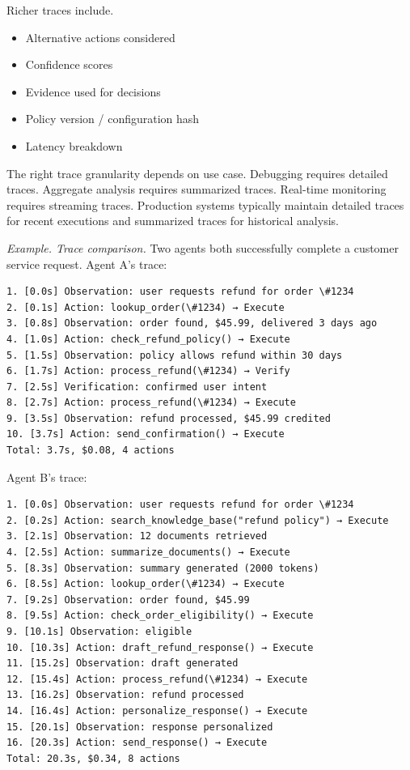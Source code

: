 Richer traces include.

\begin{itemize}
\item Alternative actions considered
\item Confidence scores
\item Evidence used for decisions
\item Policy version / configuration hash
\item Latency breakdown
\end{itemize}

The right trace granularity depends on use case. Debugging requires detailed traces. Aggregate analysis requires summarized traces. Real-time monitoring requires streaming traces. Production systems typically maintain detailed traces for recent executions and summarized traces for historical analysis.

\textit{Example. Trace comparison.} Two agents both successfully complete a customer service request. Agent A's trace:

{\footnotesize
\begin{verbatim}
1. [0.0s] Observation: user requests refund for order \#1234
2. [0.1s] Action: lookup_order(\#1234) → Execute
3. [0.8s] Observation: order found, $45.99, delivered 3 days ago
4. [1.0s] Action: check_refund_policy() → Execute
5. [1.5s] Observation: policy allows refund within 30 days
6. [1.7s] Action: process_refund(\#1234) → Verify
7. [2.5s] Verification: confirmed user intent
8. [2.7s] Action: process_refund(\#1234) → Execute
9. [3.5s] Observation: refund processed, $45.99 credited
10. [3.7s] Action: send_confirmation() → Execute
Total: 3.7s, $0.08, 4 actions
\end{verbatim}
}

Agent B's trace:

{\footnotesize
\begin{verbatim}
1. [0.0s] Observation: user requests refund for order \#1234
2. [0.2s] Action: search_knowledge_base("refund policy") → Execute
3. [2.1s] Observation: 12 documents retrieved
4. [2.5s] Action: summarize_documents() → Execute
5. [8.3s] Observation: summary generated (2000 tokens)
6. [8.5s] Action: lookup_order(\#1234) → Execute
7. [9.2s] Observation: order found, $45.99
8. [9.5s] Action: check_order_eligibility() → Execute
9. [10.1s] Observation: eligible
10. [10.3s] Action: draft_refund_response() → Execute
11. [15.2s] Observation: draft generated
12. [15.4s] Action: process_refund(\#1234) → Execute
13. [16.2s] Observation: refund processed
14. [16.4s] Action: personalize_response() → Execute
15. [20.1s] Observation: response personalized
16. [20.3s] Action: send_response() → Execute
Total: 20.3s, $0.34, 8 actions
\end{verbatim}
}

